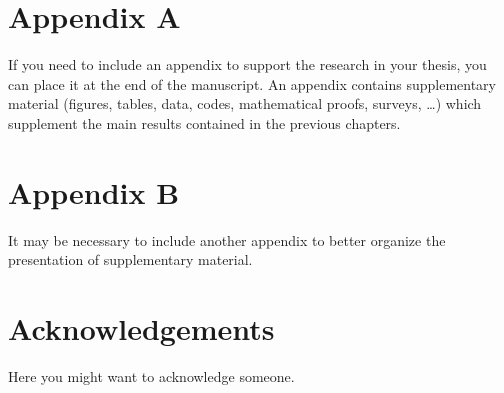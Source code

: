 \documentclass{config/PoliMi3i_thesis}
\begin{document}


\cleardoublepage
{} %
\appendix
\chapter{Appendix A}
If you need to include an appendix to support the research in your thesis, you can place it at the end of the manuscript.
An appendix contains supplementary material (figures, tables, data, codes, mathematical proofs, surveys, \dots)
which supplement the main results contained in the previous chapters.

\chapter{Appendix B}
It may be necessary to include another appendix to better organize the presentation of supplementary material.

\chapter*{Acknowledgements}
Here you might want to acknowledge someone.

\cleardoublepage
\end{document}
